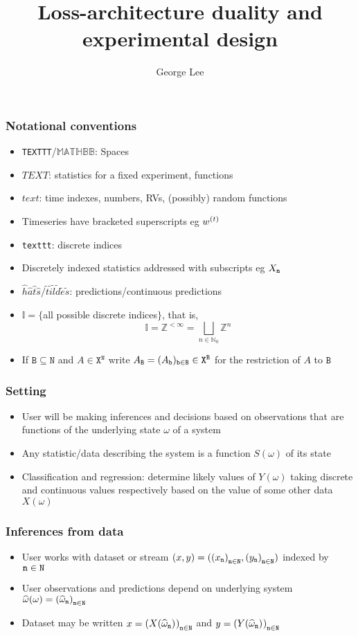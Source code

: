 \documentclass{beamer}
\title{Loss-architecture duality and experimental design}
\subtitle{George Lee}
\newcommand{\TYPE}[1][X]{{\texttt{#1}}}
\newcommand{\BATCH}{{\texttt{B}}}
\newcommand{\INDICES}{{\mathbb{I}}}
\newcommand{\Feature}{{x}}
\newcommand{\Target}{{y}}
\newcommand{\TARGET}{{Y}}
\newcommand{\FEATURE}{{X}}
\newcommand{\ROWS}{{\texttt N}}
\newcommand{\Phase}{{\omega}}
\newcommand{\PhaseK}{{\widehat\Phase}}
\newcommand{\STAT}{{S}}
\begin{document}
\begin{frame}
\titlepage
\end{frame}
\begin{frame}
\frametitle{Notational conventions}
\begin{itemize}
  \item
    \texttt{TEXTTT}/$\mathbb{MATHBB}$: Spaces
  \item
    $TEXT$: statistics for a fixed experiment, functions
  \item
    $text$: time indexes, numbers, RVs, (possibly) random functions
  \item
    Timeseries have bracketed superscripts eg $\TS[w]$
  \item
    \texttt{texttt}: discrete indices
  \item
    Discretely indexed statistics addressed with subscripts eg $\IND$
  \item
    $\hat h\hat a\hat t\hat s/\tilde t\tilde i\tilde l\tilde d\tilde e\tilde s$: predictions/continuous predictions
  \item
    $\INDICES=\{$all possible discrete indices$\}$, that is,
    $$
    \INDICES=\mathbb Z^{<\infty}=\bigsqcup_{n\in\mathbb N_0}\mathbb Z^n
    $$
  \item
    If $\BATCH\subseteq\ROWS$ and  $A\in\TYPE^\ROWS$ write $\REST[A]=(\IND[A][b])_{\texttt b\in\BATCH}\in\TYPE^\BATCH$ for the restriction of $A$ to $\BATCH$
\end{itemize}
\end{frame}
\begin{frame}
\frametitle{Setting}
\begin{itemize}
  \item
    User will be making inferences and decisions based on observations that are functions of the underlying state $\Phase$ of a system
  \item
    Any statistic/data describing the system is a function $\STAT(\Phase)$ of its state
  \item
    Classification and regression: determine likely values of $\TARGET(\Phase)$ taking discrete and continuous values respectively based on the value of some other data $\FEATURE(\Phase)$
\end{itemize}
\end{frame}
\begin{frame}
\frametitle{Inferences from data}
\begin{itemize}
  \item
    User works with dataset or stream $(\Feature,\Target)=(\ENUM[\Feature],\ENUM[\Target])$ indexed by $\ind\in\ROWS$
  \item
    User observations and predictions depend on underlying system $\PhaseK(\Phase)=\ENUM[\PhaseK]$

  \item
    Dataset may be written $\Feature=\ENUM[\FEATURE(\PhaseK_{\ind})][][\ROWS][\ind\in]$ and $\Target=\ENUM[\TARGET(\PhaseK_{\ind})][][\ROWS][\ind\in]$
\end{itemize}
\end{frame}
\end{document}
